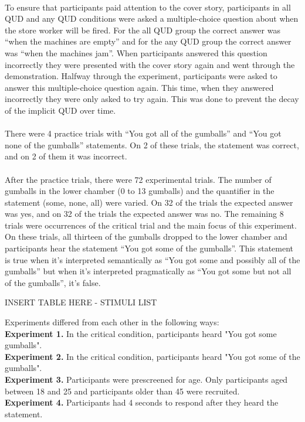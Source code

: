 \documentclass[12pt]{article}
\begin{document}
\paragraph{}To ensure that participants paid attention to the cover story, participants in all QUD and any QUD conditions were asked a multiple-choice question about when the store worker will be fired. For the all QUD group the correct answer was “when the machines are empty” and for the any QUD group the correct answer was “when the machines jam”. When participants answered this question incorrectly they were presented with the cover story again and went through the demonstration. Halfway through the experiment, participants were asked to answer this multiple-choice question again. This time, when they answered incorrectly they were only asked to try again. This was done to prevent the decay of the implicit QUD over time. 

\paragraph{}There were 4 practice trials with “You got all of the gumballs” and “You got none of the gumballs” statements. On 2 of these trials, the statement was correct, and on 2 of them it was incorrect. 

\paragraph{}After the practice trials, there were 72 experimental trials. The number of gumballs in the lower chamber (0 to 13 gumballs) and the quantifier in the statement (some, none, all) were varied.  On 32 of the trials the expected answer was yes, and on 32 of the trials the expected answer was no. The remaining 8 trials were occurrences of the critical trial and the main focus of this experiment. On these trials, all thirteen of the gumballs dropped to the lower chamber and participants hear the statement “You got some of the gumballs”. This statement is true when it’s interpreted semantically as “You got some and possibly all of the gumballs” but when it’s interpreted pragmatically as “You got some but not all of the gumballs”, it’s false.

\begin{center}INSERT TABLE HERE - STIMULI LIST\end{center}

Experiments differed from each other in the following ways:\\
\textbf{Experiment 1.} In the critical condition, participants heard "You got some gumballs".\\
\textbf{Experiment 2.} In the critical condition, participants heard "You got some of the gumballs".\\
\textbf{Experiment 3.} Participants were prescreened for age. Only participants aged between 18 and 25 and participants older than 45 were recruited.\\
\textbf{Experiment 4.} Participants had 4 seconds to respond after they heard the statement. 
\end{document}
